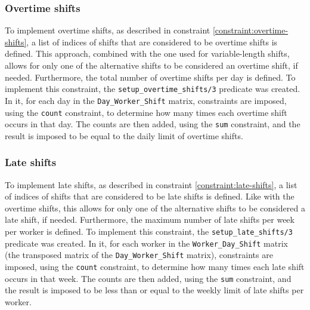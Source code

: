 \documentclass[conference]{IEEEtran}
\def\constraint#1{\vspace{4pt} {#1}}
\begin{document}
\constraint {
    \subsubsection*{Overtime shifts}
    To implement overtime shifts, as described in constraint \ref{constraint:overtime-shifts}, a list of indices of shifts that are considered to be overtime shifts is defined. This approach, combined with the one used for variable-length shifts, allows for only one of the alternative shifts to be considered an overtime shift, if needed. Furthermore, the total number of overtime shifts per day is defined.
    To implement this constraint, the \texttt{setup\_overtime\_shifts/3} predicate was created. In it, for each day in the \texttt{Day\_Worker\_Shift} matrix, constraints are imposed, using the \texttt{count} constraint, to determine how many times each overtime shift occurs in that day. The counts are then added, using the \texttt{sum} constraint, and the result is imposed to be equal to the daily limit of overtime shifts.
}

\constraint {
    \subsubsection*{Late shifts}
    To implement late shifts, as described in constraint \ref{constraint:late-shifts}, a list of indices of shifts that are considered to be late shifts is defined. Like with the overtime shifts, this allows for only one of the alternative shifts to be considered a late shift, if needed. Furthermore, the maximum number of late shifts per week per worker is defined.
    To implement this constraint, the \texttt{setup\_late\_shifts/3} predicate was created. In it, for each worker in the \texttt{Worker\_Day\_Shift} matrix (the transposed matrix of the \texttt{Day\_Worker\_Shift} matrix), constraints are imposed, using the \texttt{count} constraint, to determine how many times each late shift occurs in that week. The counts are then added, using the \texttt{sum} constraint, and the result is imposed to be less than or equal to the weekly limit of late shifts per worker.
}
\end{document}
